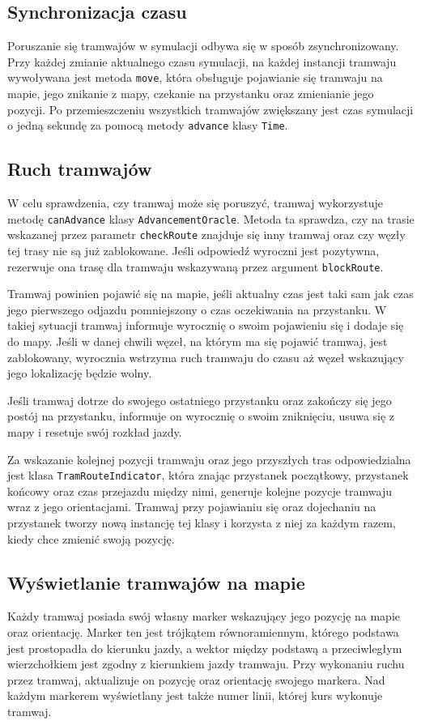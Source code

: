 \documentclass[12pt,a4paper]{article}
\begin{document}
        \subsection{Synchronizacja czasu}
            Poruszanie się tramwajów w symulacji odbywa się w sposób zsynchronizowany. Przy każdej zmianie aktualnego czasu symulacji, na każdej instancji tramwaju wywoływana jest metoda \texttt{move}, która obsługuje pojawianie się tramwaju na mapie, jego znikanie z mapy, czekanie na przystanku oraz zmienianie jego pozycji. Po przemieszczeniu wszystkich tramwajów zwiększany jest czas symulacji o jedną sekundę za pomocą metody \texttt{advance} klasy \texttt{Time}.

        \subsection{Ruch tramwajów}
            W celu sprawdzenia, czy tramwaj może się poruszyć, tramwaj wykorzystuje metodę \texttt{canAdvance} klasy \texttt{AdvancementOracle}. Metoda ta sprawdza, czy na trasie wskazanej przez parametr \texttt{checkRoute} znajduje się inny tramwaj oraz czy węzły tej trasy nie są już zablokowane. Jeśli odpowiedź wyroczni jest pozytywna, rezerwuje ona trasę dla tramwaju wskazywaną przez argument \texttt{blockRoute}.

            Tramwaj powinien pojawić się na mapie, jeśli aktualny czas jest taki sam jak czas jego pierwszego odjazdu pomniejszony o czas oczekiwania na przystanku. W takiej sytuacji tramwaj informuje wyrocznię o swoim pojawieniu się i dodaje się do mapy. Jeśli w danej chwili węzeł, na którym ma się pojawić tramwaj, jest zablokowany, wyrocznia wstrzyma ruch tramwaju do czasu aż węzeł wskazujący jego lokalizację będzie wolny.

            Jeśli tramwaj dotrze do swojego ostatniego przystanku oraz zakończy się jego postój na przystanku, informuje on wyrocznię o swoim zniknięciu, usuwa się z mapy i resetuje swój rozkład jazdy.

            Za wskazanie kolejnej pozycji tramwaju oraz jego przyszłych tras odpowiedzialna jest klasa \texttt{TramRouteIndicator}, która znając przystanek początkowy, przystanek końcowy oraz czas przejazdu między nimi, generuje kolejne pozycje tramwaju wraz z jego orientacjami. Tramwaj przy pojawianiu się oraz dojechaniu na przystanek tworzy nową instancję tej klasy i korzysta z niej za każdym razem, kiedy chce zmienić swoją pozycję.

        \subsection{Wyświetlanie tramwajów na mapie}
            Każdy tramwaj posiada swój własny marker wskazujący jego pozycję na mapie oraz orientację. Marker ten jest trójkątem równoramiennym, którego podstawa jest prostopadła do kierunku jazdy, a wektor między podstawą a przeciwległym wierzchołkiem jest zgodny z kierunkiem jazdy tramwaju. Przy wykonaniu ruchu przez tramwaj, aktualizuje on pozycję oraz orientację swojego markera. Nad każdym markerem wyświetlany jest także numer linii, której kurs wykonuje tramwaj.
\end{document}

